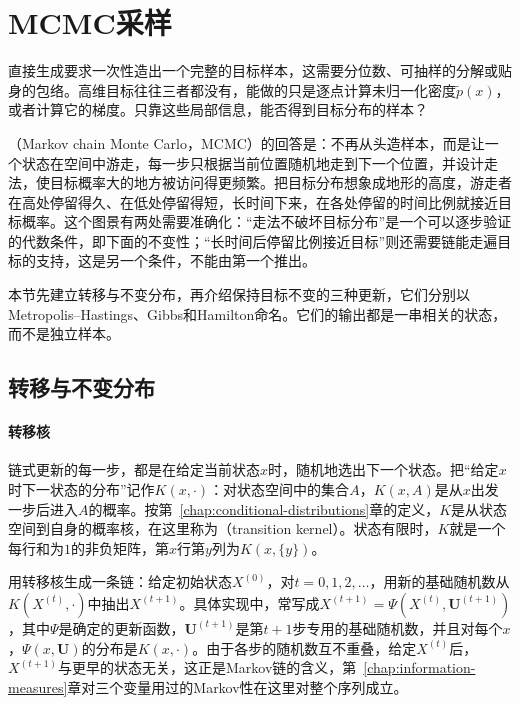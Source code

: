 \section{MCMC采样}
\label{sec:sgen-mcmc}

直接生成要求一次性造出一个完整的目标样本，这需要分位数、可抽样的分解或贴身的包络。高维目标往往三者都没有，能做的只是逐点计算未归一化密度$\widetilde{p}(x)$，或者计算它的梯度。只靠这些局部信息，能否得到目标分布的样本？

（Markov chain Monte Carlo，MCMC）的回答是：不再从头造样本，而是让一个状态在空间中游走，每一步只根据当前位置随机地走到下一个位置，并设计走法，使目标概率大的地方被访问得更频繁。把目标分布想象成地形的高度，游走者在高处停留得久、在低处停留得短，长时间下来，在各处停留的时间比例就接近目标概率。这个图景有两处需要准确化：“走法不破坏目标分布”是一个可以逐步验证的代数条件，即下面的不变性；“长时间后停留比例接近目标”则还需要链能走遍目标的支持，这是另一个条件，不能由第一个推出。

本节先建立转移与不变分布，再介绍保持目标不变的三种更新，它们分别以Metropolis--Hastings、Gibbs和Hamilton命名。它们的输出都是一串相关的状态，而不是独立样本。

\subsection{转移与不变分布}
\label{sec:sgen-invariance}

\paragraph{转移核}
链式更新的每一步，都是在给定当前状态$x$时，随机地选出下一个状态。把“给定$x$时下一状态的分布”记作$K(x,\cdot)$：对状态空间中的集合$A$，$K(x,A)$是从$x$出发一步后进入$A$的概率。按第~\ref{chap:conditional-distributions}章的定义，$K$是从状态空间到自身的概率核，在这里称为（transition kernel）。状态有限时，$K$就是一个每行和为$1$的非负矩阵，第$x$行第$y$列为$K(x,\{y\})$。

用转移核生成一条链：给定初始状态$X^{(0)}$，对$t=0,1,2,\dots$，用新的基础随机数从$K(X^{(t)},\cdot)$中抽出$X^{(t+1)}$。具体实现中，常写成$X^{(t+1)}=\Psi(X^{(t)},\bm{U}^{(t+1)})$，其中$\Psi$是确定的更新函数，$\bm{U}^{(t+1)}$是第$t+1$步专用的基础随机数，并且对每个$x$，$\Psi(x,\bm{U})$的分布是$K(x,\cdot)$。由于各步的随机数互不重叠，给定$X^{(t)}$后，$X^{(t+1)}$与更早的状态无关，这正是Markov链的含义，第~\ref{chap:information-measures}章对三个变量用过的Markov性在这里对整个序列成立。

